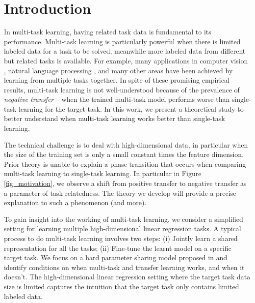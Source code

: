 \section{Introduction}

In multi-task learning, having related task data is fundamental to its performance.
Multi-task learning is particularly powerful when there is limited labeled data for a task to be solved, meanwhile more labeled data from different but related tasks is available.
For example, many applications in computer vision \cite{ZSSGM18}, natural language processing \cite{MTDNN19}, and many other areas have been achieved by learning from multiple tasks together.
In spite of these promising empirical results, multi-task learning is not well-understood because of the prevalence of \textit{negative transfer} -- when the trained multi-task model performs worse than single-task learning for the target task.
In this work, we present a theoretical study to better understand when multi-task learning works better than single-task learning. %

 The technical challenge is to deal with high-dimensional data, in particular when the size of the training set is only a small constant times the feature dimension.
Prior theory is unable to explain a phase transition that occurs when comparing multi-task learning to single-task learning.
In particular in Figure \ref{fig_motivation}, we observe a shift from positive transfer to negative transfer as a parameter of task relatedness.
The theory we develop will provide a precise explanation to such a phenomenon (and more).

To gain insight into the working of multi-task learning, we consider a simplified setting for learning multiple high-dimensional linear regression tasks.
A typical process to do multi-task learning involves two steps:
(i) Jointly learn a shared representation for all the tasks;
(ii) Fine-tune the learnt model on a specific target task.
We focus on a hard parameter sharing model proposed in \cite{WZR20} and identify conditions on when multi-task and transfer learning works, and when it doesn't.
The high-dimensional linear regression setting where the target task data size is limited captures the intuition that the target task only contains limited labeled data.


